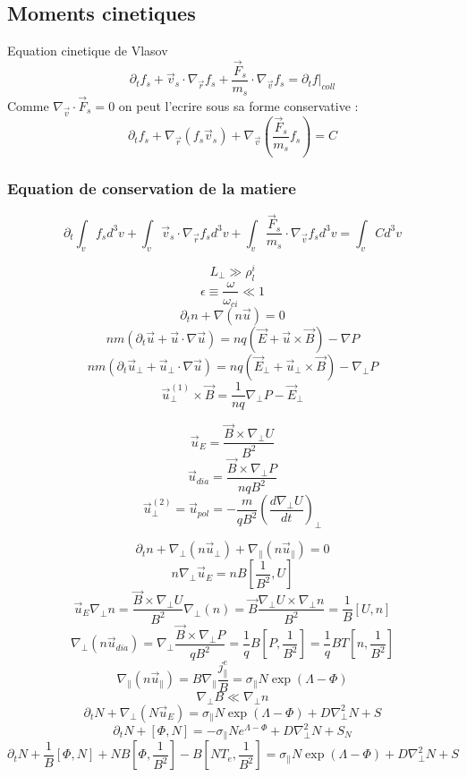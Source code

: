 \documentclass[12pt]{article}
\begin{document}
\subsection{Moments cinetiques}
Equation cinetique de Vlasov 
$$\partial_t f_s
+\vec{v}_s\cdot\nabla_{\vec{r}}f_s+\frac{\vec{F}_s}{m_s}\cdot\nabla_{\vec{v}}f_s=\partial_tf{|_{coll}}$$
Comme $\nabla_{\vec{v}}\cdot\vec{F}_s=0$ on peut l'ecrire sous sa forme
conservative :
$$\partial_t f_s
+\nabla_{\vec{r}}\left(f_s\vec{v}_s\right)+\nabla_{\vec{v}}\left(\frac{\vec{F}_s}{m_s}f_s\right)=C$$
\subsubsection{Equation de conservation de la matiere}
$$\partial_t\int_v f_s d^3v
+\int_v\vec{v}_s\cdot\nabla_{\vec{r}}f_sd^3v+\int_v\frac{\vec{F}_s}{m_s}\cdot\nabla_{\vec{v}}f_sd^3v=\int_vCd^3v$$


$$L_\perp\gg \rho^i_{l}$$
$$\epsilon\equiv\frac{\omega}{\omega_{ci}}\ll 1$$
$$\partial_tn+\nabla\left(n\vec{u}\right)=0$$
$$nm\left(\partial_t\vec{u}+\vec{u}\cdot\nabla\vec{u}\right)=nq\left(\vec{E}+\vec{u}\times\vec{B}\right)-\nabla
P$$
$$nm\left(\partial_t\vec{u}_\perp+\vec{u}_\perp\cdot\nabla\vec{u}\right)=nq\left(\vec{E}_\perp+\vec{u}_\perp\times\vec{B}\right)-\nabla_\perp
P$$
$$\vec{u}^{(1)}_\perp\times\vec{B}=\frac{1}{nq}\nabla_\perp P-\vec{E}_\perp$$

$$\vec{u}_E=\frac{\vec{B}\times\nabla_\perp U}{B^2}$$
$$\vec{u}_{dia}=\frac{\vec{B}\times\nabla_\perp P}{nqB^2}$$
$$\vec{u}^{(2)}_\perp=\vec{u}_{pol}=-\frac{m}{qB^2}\left(\frac{d\nabla_\perp U}{dt}\right)_\perp$$

$$\partial_tn+\nabla_\perp\left(n\vec{u}_\perp\right)+\nabla_\parallel\left(n\vec{u}_\parallel\right)=0$$
$$n\nabla_\perp\vec{u}_E=nB\left[\frac{1}{B^2},U\right]$$
$$\vec{u}_E\nabla_\perp n=\frac{\vec{B}\times\nabla_\perp
U}{B^2}\nabla_\perp\left(n\right)=\vec{B}\frac{\nabla_\perp
U\times\nabla_\perp n}{B^2}=\frac{1}{B}\left[U,n\right]$$
$$\nabla_\perp\left(n\vec{u}_{dia}\right)=\nabla_\perp\frac{\vec{B}\times\nabla_\perp
P}{qB^2}=\frac{1}{q}B\left[P,\frac{1}{B^2}\right]=\frac{1}{q}BT\left[n,\frac{1}{B^2}\right]$$
$$\nabla_\parallel\left(n\vec{u}_\parallel\right)=B\nabla_\parallel\frac{j^e_\parallel}{B}=\sigma_\parallel
N \exp\left(\Lambda-\Phi\right)$$
$$\nabla_\perp B \ll \nabla_\perp n $$
$$\partial_tN+\nabla_\perp\left(N \vec{u}_E\right)=\sigma_\parallel N \exp\left(\Lambda-\Phi\right)+D\nabla^2_\perp N +S$$
$$\partial_tN+\left[\Phi,N\right]=-\sigma_\parallel N e^{\Lambda-\Phi}+D\nabla^2_\perp N +S_N$$
$$\partial_tN+\frac{1}{B}\left[\Phi,N\right]+NB\left[\Phi,\frac{1}{B^2}\right]-B\left[NT_e,\frac{1}{B^2}\right]=\sigma_\parallel N \exp\left(\Lambda-\Phi\right)+D\nabla^2_\perp N +S$$
\end{document}
